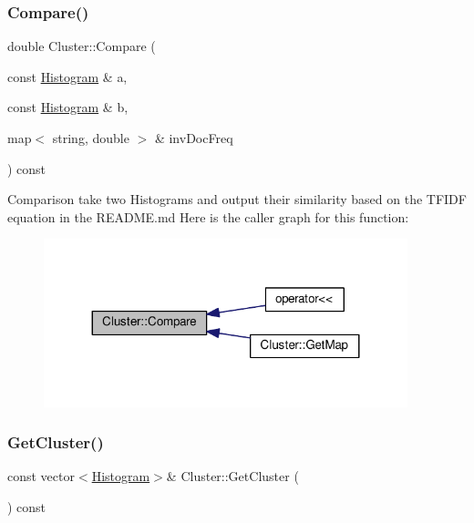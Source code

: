 \mbox{\label{class_cluster_ad4f8765aefafc838c95a9c2334ee0356}} 
\subsubsection{\texorpdfstring{Compare()}{Compare()}}
{\footnotesize\ttfamily double Cluster\+::\+Compare (\begin{DoxyParamCaption}\item[{const \hyperlink{class_histogram}{Histogram} \&}]{a,  }\item[{const \hyperlink{class_histogram}{Histogram} \&}]{b,  }\item[{map$<$ string, double $>$ \&}]{inv\+Doc\+Freq }\end{DoxyParamCaption}) const}

Comparison take two Histograms and output their similarity based on the T\+F\+I\+DF equation in the R\+E\+A\+D\+M\+E.\+md Here is the caller graph for this function\+:
\nopagebreak
\begin{figure}[H]
\begin{center}
\leavevmode
\includegraphics[width=299pt]{class_cluster_ad4f8765aefafc838c95a9c2334ee0356_icgraph}
\end{center}
\end{figure}
\mbox{\label{class_cluster_aa890420aa5906859751f7920dc5b30d0}} 
\subsubsection{\texorpdfstring{Get\+Cluster()}{GetCluster()}\hspace{0.1cm}{\footnotesize\ttfamily [1/2]}}
{\footnotesize\ttfamily const vector$<$\hyperlink{class_histogram}{Histogram}$>$\& Cluster\+::\+Get\+Cluster (\begin{DoxyParamCaption}{ }\end{DoxyParamCaption}) const\hspace{0.3cm}{\ttfamily [inline]}}

